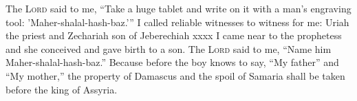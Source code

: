 
\begin{inparaenum}
     The \textsc{Lord} said to me, ``Take a huge tablet and write on it with a man's engraving tool: 'Maher-shalal-hash-baz.'\thinspace''%
     I called reliable witnesses to witness for me: Uriah the priest and Zechariah son of Jeberechiah xxxx%
     I came near to the prophetess and she conceived and gave birth to a son. The \textsc{Lord} said to me, ``Name him Maher-shalal-hash-baz.''%
     Because before the boy knows to say, ``My father'' and ``My mother,'' the property of Damascus and the spoil of Samaria shall be taken before the king of Assyria.%
    
    
    
    
    
    
\end{inparaenum}
